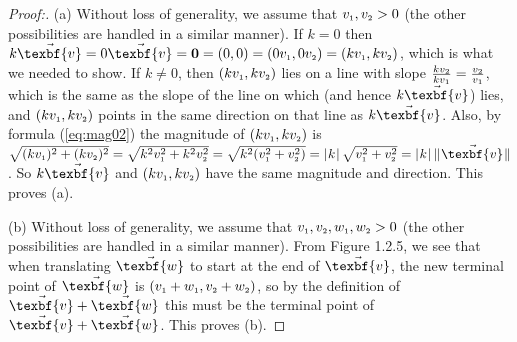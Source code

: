 \begin{proofbar}\vspace{-3mm}\begin{proof}[Proof:] (a)
 Without loss of generality, we assume that $v_{\scriptscriptstyle 1}, v_{\scriptscriptstyle 2} > 0$ (the other
 possibilities are handled in a similar manner). If $k = 0$ then $k\vec{\texbf{v}} = 0\vec{\texbf{v}} = \textbf{0} = (0,0)
 = \vectwo{0v} = \vectwo{kv}$, which
 is what we needed to show. If $k \ne 0$, then $(kv_{\scriptscriptstyle 1},kv_{\scriptscriptstyle 2})$ lies on a line
 with slope $\frac{kv_{\scriptscriptstyle 2}}{kv_{\scriptscriptstyle 1}} =
 \frac{v_{\scriptscriptstyle 2}}{v_{\scriptscriptstyle 1}}$, which is the same as the slope of the line on which
  (and hence $k\vec{\texbf{v}}$) lies, and $(kv_{\scriptscriptstyle 1},kv_{\scriptscriptstyle 2})$ points in the
 same direction on that line as $k\vec{\texbf{v}}$.  Also, by formula (\ref{eq:mag02}) the magnitude of
 $(kv_{\scriptscriptstyle 1},kv_{\scriptscriptstyle 2})$ is $\sqrt{(\ssub{kv}{1})^2 +
 (\ssub{kv}{2})^2} = \sqrt{k^2 \ssub{v}{1}^2 + k^2 \ssub{v}{2}^2} = \sqrt{k^2 (\ssub{v}{1}^2 + \ssub{v}{2}^2)} =
 \abs{k} \,\sqrt{\ssub{v}{1}^2 + \ssub{v}{2}^2} = \abs{k} \,\norm{\vec{\texbf{v}}}$.
 So $k\vec{\texbf{v}}$ and $(kv_{\scriptscriptstyle 1},kv_{\scriptscriptstyle 2})$ have the same magnitude and direction.
 This proves (a).\vspace{1mm}
 
 \piccaption[]{}
 \par\noindent(b)
 Without loss of generality, we assume that $v_{\scriptscriptstyle 1}, v_{\scriptscriptstyle 2},
 w_{\scriptscriptstyle 1},w_{\scriptscriptstyle 2} > 0$ (the other possibilities are handled in a similar manner).
 From Figure 1.2.5, we see that when translating $\vec{\texbf{w}}$ to start at the end of $\vec{\texbf{v}}$, the new
 terminal point of $\vec{\texbf{w}}$ is $(v_{\scriptscriptstyle 1} + w_{\scriptscriptstyle 1}, v_{\scriptscriptstyle 2} + w_{\scriptscriptstyle 2})$, so by the definition of $\vec{\texbf{v}} + \vec{\texbf{w}}$ this must
 be the terminal point of $\vec{\texbf{v}} + \vec{\texbf{w}}$. This proves (b).\vspace{-3mm}
\end{proof}\end{proofbar}
